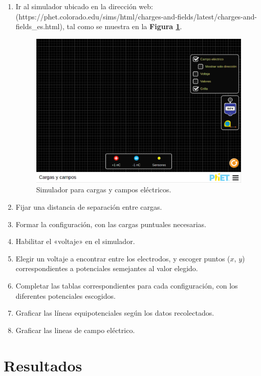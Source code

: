 \documentclass[letter,11pt]{article}
\begin{document}
\begin{enumerate}
\item Ir al simulador ubicado en la dirección web:
(https://phet.colorado.edu/sims/html/charges-and-fields/latest/charges-and-fields\_es.html),
tal como se muestra en la \textbf{Figura \ref{figura1}}.

\begin{figure}[!h]
\centering
\includegraphics[scale=0.34]{resources/figura01.eps}
\caption{Simulador para cargas y campos eléctricos.}
\label{figura1}
\end{figure}
\item Fijar una distancia de separación entre cargas.
\item Formar la configuración, con las cargas puntuales necesarias.
\item Habilitar el «voltaje» en el simulador.
\item Elegir un voltaje a encontrar entre los electrodos, y escoger puntos
($x$, $y$) correspondientes a potenciales semejantes al valor elegido.
\item Completar las tablas correspondientes para cada configuración, con los
diferentes potenciales escogidos.
\item Graficar las líneas equipotenciales según los datos recolectados.
\item Graficar las lineas de campo eléctrico.
\end{enumerate}

\section{Resultados}
\end{document}
